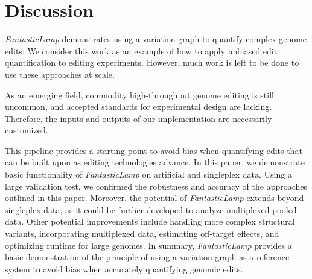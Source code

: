 \documentclass{bioinfo}
\theoremstyle{definition}
\begin{document}
\section*{Discussion}
\label{sec:discussion}
\textit{FantasticLamp} demonstrates using a variation graph to quantify complex genome edits.
We consider this work as an example of how to apply unbiased edit quantification to editing experiments.
However, much work is left to be done to use these approaches at scale.

As an emerging field, commodity high-throughput genome editing is still uncommon, and accepted standards for experimental design are lacking.
Therefore, the inputs and outputs of our implementation are necessarily customized.

This pipeline provides a starting point to avoid bias when quantifying edits that can be built upon as editing technologies advance.
In this paper, we demonstrate basic functionality of \textit{FantasticLamp} on artificial and singleplex data. 
Using a large validation test, we confirmed the robustness and accuracy of the approaches outlined in this paper.
Moreover, the potential of \textit{FantasticLamp} extends beyond singleplex data, as it could be further developed to analyze multiplexed pooled data.
Other potential improvements include handling more complex structural variants, incorporating multiplexed data, estimating off-target effects, and optimizing runtime for large genomes.
In summary, \textit{FantasticLamp} provides a basic demonstration of the principle of using a variation graph as a reference system to avoid bias when accurately quantifying genomic edits.
\end{document}
